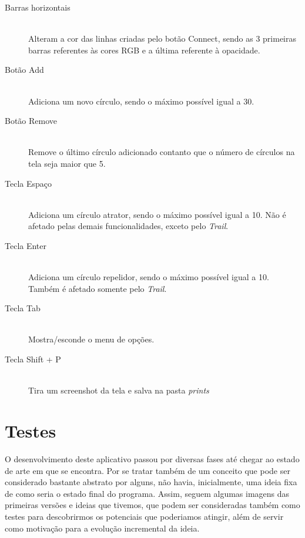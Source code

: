 \documentclass[12pt]{article}
\begin{document}
\begin{description}
\item[Barras horizontais] \hfill \\
Alteram a cor das linhas criadas pelo botão Connect, sendo as 3 primeiras barras referentes às cores RGB e a última referente à opacidade.
\vspace{0.4 true cm}

\item[Botão Add] \hfill \\
Adiciona um novo círculo, sendo o máximo possível igual a 30.
\vspace{0.4 true cm}

\item[Botão Remove] \hfill \\
Remove o último círculo adicionado contanto que o número de círculos na tela seja maior que 5.
\vspace{0.4 true cm}

\item[Tecla Espaço] \hfill \\
Adiciona um círculo atrator, sendo o máximo possível igual a 10. Não é afetado pelas demais funcionalidades, exceto pelo \textit{Trail}.
\vspace{0.4 true cm}

\item[Tecla Enter] \hfill \\
Adiciona um círculo repelidor, sendo o máximo possível igual a 10. Também é afetado somente pelo \textit{Trail}.
\vspace{0.4 true cm}

\item[Tecla Tab] \hfill \\
Mostra/esconde o menu de opções.
\vspace{0.4 true cm}

\item[Tecla Shift + P] \hfill \\
Tira um screenshot da tela e salva na pasta \textit{prints}

\end{description}

\section{Testes}
\label{testes}

O desenvolvimento deste aplicativo passou por diversas fases até chegar ao estado de arte em que se encontra. Por se tratar também de um conceito
que pode ser considerado bastante abstrato por alguns, não havia, inicialmente, uma ideia fixa de como seria o estado final do programa. Assim,
seguem algumas imagens das primeiras versões e ideias que tivemos, que podem ser consideradas também como testes para descobrirmos os potenciais
que poderiamos atingir, além de servir como motivação para a evolução incremental da ideia.
\end{document}
